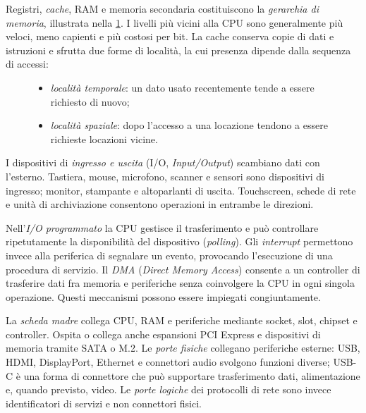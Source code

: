 \clearpage

Registri, \emph{cache}, RAM e memoria secondaria costituiscono la
\emph{gerarchia di memoria}, illustrata nella
\cref{fig:fi-gerarchia-memoria}. I livelli più vicini alla CPU sono
generalmente più veloci, meno capienti e più costosi per bit.
La cache conserva copie di dati e istruzioni e sfrutta due forme di
località, la cui presenza dipende dalla sequenza di accessi:
\begin{figure}[htbp]
  \begin{minipage}[c]{0.48\textwidth}
    \begin{itemize}
      \item \emph{località temporale}: un dato usato recentemente
            tende a essere richiesto di nuovo;
      \item \emph{località spaziale}: dopo l'accesso a una locazione
            tendono a essere richieste locazioni vicine.
    \end{itemize}
  \end{minipage}
  \hfill
  \begin{minipage}[c]{0.48\textwidth}
    \centering
    \resizebox{0.95\linewidth}{!}{%
    }

    \label{fig:fi-gerarchia-memoria}
  \end{minipage}
\end{figure}

I dispositivi di \emph{ingresso e uscita} (I/O, \emph{Input/Output})
scambiano dati con l'esterno. Tastiera, mouse, microfono, scanner e
sensori sono dispositivi di ingresso; monitor, stampante e altoparlanti
di uscita. Touchscreen, schede di rete e unità di archiviazione
consentono operazioni in entrambe le direzioni.

Nell'\emph{I/O programmato} la CPU gestisce il trasferimento e può
controllare ripetutamente la disponibilità del dispositivo
(\emph{polling}). Gli \emph{interrupt} permettono invece alla
periferica di segnalare un evento, provocando l'esecuzione di una
procedura di servizio. Il \emph{DMA} (\emph{Direct Memory Access})
consente a un controller di trasferire dati fra memoria e periferiche
senza coinvolgere la CPU in ogni singola operazione. Questi
meccanismi possono essere impiegati congiuntamente.

La \emph{scheda madre} collega CPU, RAM e periferiche mediante
socket, slot, chipset e controller. Ospita o collega anche espansioni
PCI Express e dispositivi di memoria tramite SATA o M.2.
Le \emph{porte fisiche} collegano periferiche esterne: USB,
HDMI, DisplayPort, Ethernet e connettori audio svolgono funzioni
diverse; USB-C è una forma di connettore che può supportare
trasferimento dati, alimentazione e, quando previsto, video.
Le \emph{porte logiche} dei protocolli di rete sono invece
identificatori di servizi e non connettori fisici.

